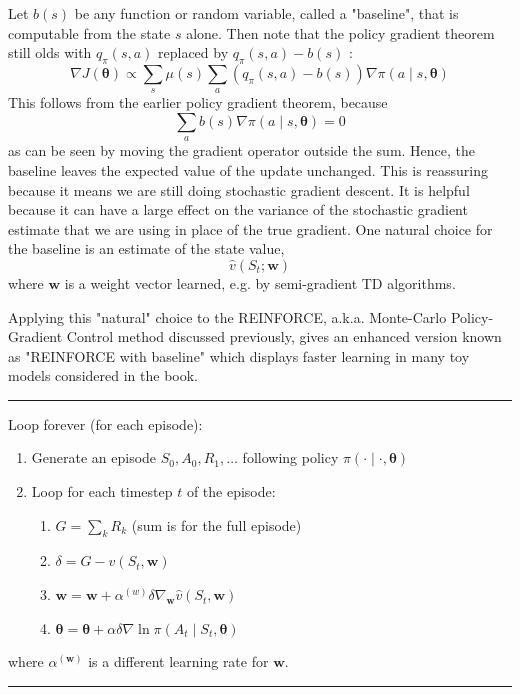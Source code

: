 \documentclass[11pt]{article}
\theoremstyle{plain} %
\theoremstyle{remark}
\begin{document}
Let $b(s)$ be any function or random variable, called a "baseline", that
  is computable from the state $s$ alone. Then note that the policy gradient theorem still olds with $q_{\pi}(s,
  a)$ replaced by $q_{\pi}(s, a)-b(s)$ :
$$
\nabla J(\boldsymbol{\theta}) \propto \sum_{s} \mu(s) \sum_{a}\left(q_{\pi}(s, a)-b(s)\right) \nabla \pi(a \mid s, \boldsymbol{\theta})
$$
This follows from the earlier policy gradient theorem, because
$$
\sum_{a} b(s) \nabla \pi(a \mid s, \boldsymbol{\theta})=0
$$
as can be seen by moving the gradient operator outside the sum. Hence, the baseline leaves the expected value of the update unchanged. This is reassuring because it means we are still doing stochastic
  gradient descent. It is helpful because it can have a large effect on the variance of the
  stochastic gradient estimate that we are using in place of the true gradient. One natural choice for the baseline is an estimate of the state value,
$$
\hat{v}\left(S_{t} ; \boldsymbol{w}\right)
$$
where $\boldsymbol{w}$ is a weight vector learned, e.g. by semi-gradient TD
algorithms.

Applying this "natural" choice to the REINFORCE, a.k.a.  Monte-Carlo Policy-Gradient Control method discussed previously, gives
  an enhanced version known as "REINFORCE with baseline" which displays faster
  learning in many toy models considered in the book.


  \vspace*{0.65em}
  \hrule
  
  Loop forever (for each episode):
              \begin{enumerate}[label=(\arabic*)]
                \item Generate an episode $S_{0}, A_{0}, R_{1}, \ldots$ following policy
                $\pi(\cdot \mid \cdot, \boldsymbol{\theta})$
                \item Loop for each timestep $t$ of the episode:
                  \begin{enumerate}[label=(\arabic*)]
                    \item $G=\sum_{k} R_{k}$ (sum is for the full episode)
                    \item $\delta=G-\hat{v}\left(S_{t}, \boldsymbol{w}\right)$
                    \item $\boldsymbol{w}=\boldsymbol{w}+\alpha^{(w)} \delta \nabla_{\boldsymbol{w}}
                    \hat{v}\left(S_{t}, \boldsymbol{w}\right)$
                    \item $\boldsymbol{\theta}=\boldsymbol{\theta}+\alpha \delta \nabla \ln
                    \pi\left(A_{t} \mid S_{t}, \boldsymbol{\theta}\right)$
                  \end{enumerate}
                \end{enumerate}
                where $\alpha^{(\boldsymbol{w})}$ is a different learning rate for
                $\boldsymbol{w}$.
  \vspace*{0.65em}
  \hrule
\end{document}
